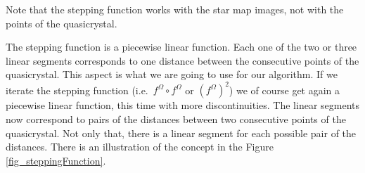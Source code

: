 \documentclass[text.tex]{subfiles}
\begin{document}
\begin{remark}
Note that the stepping function works with the star map images, not with the points of the quasicrystal. 
\end{remark}

The stepping function is a piecewise linear function. Each one of the two or three linear segments corresponds to one distance between the consecutive points of the quasicrystal. This aspect is what we are going to use for our algorithm. If we iterate the stepping function (i.e.~$f^\Omega\circ{}f^\Omega$ or $(f^\Omega)^2$) we of course get again a piecewise linear function, this time with more discontinuities. The linear segments now correspond to pairs of the distances between two consecutive points of the quasicrystal. Not only that, there is a linear segment for each possible pair of the distances. There is an illustration of the concept in the Figure \ref{fig_steppingFunction}. 
\end{document}
